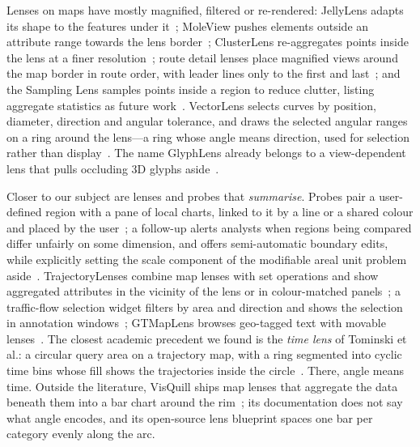 Lenses on maps have mostly magnified, filtered or re-rendered: JellyLens adapts
its shape to the features under it~\cite{pindat2012jellylens}; MoleView pushes
elements outside an attribute range towards the lens
border~\cite{hurter2011moleview}; ClusterLens re-aggregates points inside the lens
at a finer resolution~\cite{zhang2020clusterlens}; route detail lenses place
magnified views around the map border in route order, with leader lines only to
the first and last~\cite{karnick2010route}; and the Sampling Lens samples points
inside a region to reduce clutter, listing aggregate statistics as future
work~\cite{ellis2005sampling}. VectorLens selects curves by position, diameter,
direction and angular tolerance, and draws the selected angular ranges on a ring
around the lens---a ring whose angle means direction, used for selection rather
than display~\cite{dumas2015vectorlens}. The name GlyphLens already belongs to a
view-dependent lens that pulls occluding 3D glyphs aside~\cite{tong2017glyphlens}.

Closer to our subject are lenses and probes that \emph{summarise}. Probes pair a
user-defined region with a pane of local charts, linked to it by a line or a
shared colour and placed by the user~\cite{butkiewicz2008probes}; a follow-up
alerts analysts when regions being compared differ unfairly on some dimension, and
offers semi-automatic boundary edits, while explicitly setting the scale
component of the modifiable areal unit problem aside~\cite{butkiewicz2010maup}.
TrajectoryLenses combine map lenses with set operations and show aggregated
attributes in the vicinity of the lens or in colour-matched
panels~\cite{kruger2013trajectorylenses}; a traffic-flow selection widget filters
by area and direction and shows the selection in annotation
windows~\cite{scheepens2016traffic}; GTMapLens browses geo-tagged text with movable
lenses~\cite{ma2020gtmaplens}. The closest academic precedent we found is the
\emph{time lens} of Tominski et al.: a circular query area on a trajectory map,
with a ring segmented into cyclic time bins whose fill shows the trajectories
inside the circle~\cite{tominski2012stacking}. There, angle means time.
Outside the literature, VisQuill ships map lenses that aggregate the data beneath them into a
bar chart around the rim~\cite{visquill}; its documentation does not say what
angle encodes, and its open-source lens blueprint spaces one bar per category
evenly along the arc.


